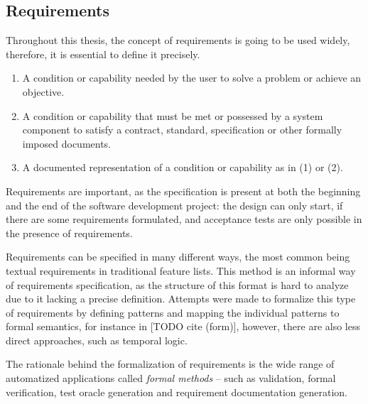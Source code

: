 \subsection{Requirements} \label{subs_backgrreq}

Throughout this thesis, the concept of requirements is going to be used widely, therefore, it is essential to define it precisely. 

\begin{definition}
	\mbox{}
	\begin{enumerate}
		\setlength\itemsep{0.1em}
		\item A condition or capability needed by the user to solve a problem or achieve an objective.
		\item A condition or capability that must be met or possessed by a system component to satisfy a contract, standard, specification or other formally imposed documents.
		\item A documented representation of a condition or capability as in (1) or (2).
	\end{enumerate}
\end{definition}

Requirements are important, as the specification is present at both the beginning and the end of the software development project: the design can only start, if there are some requirements formulated, and acceptance tests are only possible in the presence of requirements.

Requirements can be specified in many different ways, the most common being textual requirements in traditional feature lists. This method is an informal way of requirements specification, as the structure of this format is hard to analyze due to it lacking a precise definition. Attempts were made to formalize this type of requirements by defining patterns and mapping the individual patterns to formal semantics, for instance in [TODO cite (form)], however, there are also less direct approaches, such as temporal logic. 

The rationale behind the formalization of requirements is the wide range of automatized applications called \textit{formal methods} -- such as validation, formal verification, test oracle generation and requirement documentation generation.

